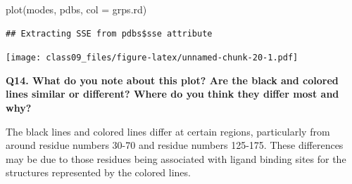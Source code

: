 \documentclass[
]{article}
\newenvironment{Shaded}{\begin{snugshade}}{\end{snugshade}}
\newcommand{\AttributeTok}[1]{\textcolor[rgb]{0.77,0.63,0.00}{#1}}
\newcommand{\FunctionTok}[1]{\textcolor[rgb]{0.00,0.00,0.00}{#1}}
\newcommand{\NormalTok}[1]{#1}
\begin{document}
\begin{Shaded}
\begin{Highlighting}[]
\FunctionTok{plot}\NormalTok{(modes, pdbs, }\AttributeTok{col =}\NormalTok{ grps.rd)}
\end{Highlighting}
\end{Shaded}

\begin{verbatim}
## Extracting SSE from pdbs$sse attribute
\end{verbatim}

\texttt{[image: class09\_files/figure-latex/unnamed-chunk-20-1.pdf]}

\textbf{Q14. What do you note about this plot? Are the black and colored
lines similar or different? Where do you think they differ most and
why?}

The black lines and colored lines differ at certain regions,
particularly from around residue numbers 30-70 and residue numbers
125-175. These differences may be due to those residues being associated
with ligand binding sites for the structures represented by the colored
lines.
\end{document}

